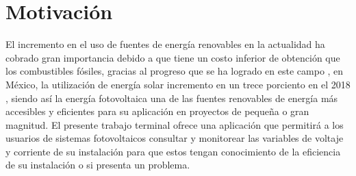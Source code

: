 \section{Motivación}
El incremento en el uso de fuentes de energía renovables en la actualidad ha cobrado gran importancia debido a que tiene un costo inferior de obtención que los combustibles fósiles, gracias al progreso que se ha logrado en este campo \citep{Not1}, en México, la utilización de energía solar incremento en un trece porciento en el 2018 \citep{Not2}, siendo así la energía fotovoltaica una de las fuentes renovables de energía más accesibles y eficientes para su aplicación en proyectos de pequeña o gran magnitud.
El presente trabajo terminal ofrece una aplicación que permitirá a los usuarios de sistemas fotovoltaicos consultar y monitorear las variables de voltaje y corriente de su instalación para que estos tengan conocimiento de la eficiencia de su instalación o si presenta un problema. 
